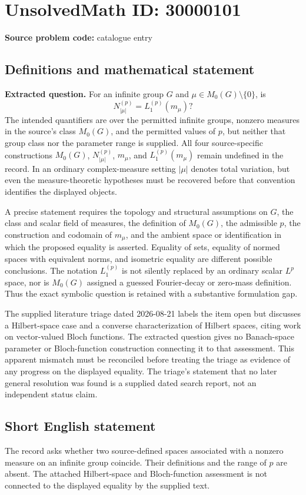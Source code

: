 \documentclass[11pt]{article}
\begin{document}
\section*{UnsolvedMath ID: 30000101}
\textbf{Source problem code:} catalogue entry
\subsection{Definitions and mathematical statement}
\textbf{Extracted question.} For an infinite group \(G\) and \(\mu\in M_0(G)\setminus\{0\}\), is\[N_{|\mu|}^{(p)}=L_1^{(p)}(m_\mu)?\] The intended quantifiers are over the permitted infinite groups, nonzero measures in the source's class \(M_0(G)\), and the permitted values of \(p\), but neither that group class nor the parameter range is supplied. All four source-specific constructions \(M_0(G)\), \(N_{|\mu|}^{(p)}\), \(m_\mu\), and \(L_1^{(p)}(m_\mu)\) remain undefined in the record. In an ordinary complex-measure setting \(|\mu|\) denotes total variation, but even the measure-theoretic hypotheses must be recovered before that convention identifies the displayed objects.\par A precise statement requires the topology and structural assumptions on \(G\), the class and scalar field of measures, the definition of \(M_0(G)\), the admissible \(p\), the construction and codomain of \(m_\mu\), and the ambient space or identification in which the proposed equality is asserted. Equality of sets, equality of normed spaces with equivalent norms, and isometric equality are different possible conclusions. The notation \(L_1^{(p)}\) is not silently replaced by an ordinary scalar \(L^p\) space, nor is \(M_0(G)\) assigned a guessed Fourier-decay or zero-mass definition. Thus the exact symbolic question is retained with a substantive formulation gap.\par The supplied literature triage dated 2026-08-21 labels the item open but discusses a Hilbert-space case and a converse characterization of Hilbert spaces, citing work on vector-valued Bloch functions. The extracted question gives no Banach-space parameter or Bloch-function construction connecting it to that assessment. This apparent mismatch must be reconciled before treating the triage as evidence of any progress on the displayed equality. The triage's statement that no later general resolution was found is a supplied dated search report, not an independent status claim.
\subsection{Short English statement}
The record asks whether two source-defined spaces associated with a nonzero measure on an infinite group coincide. Their definitions and the range of \(p\) are absent. The attached Hilbert-space and Bloch-function assessment is not connected to the displayed equality by the supplied text.
\end{document}
